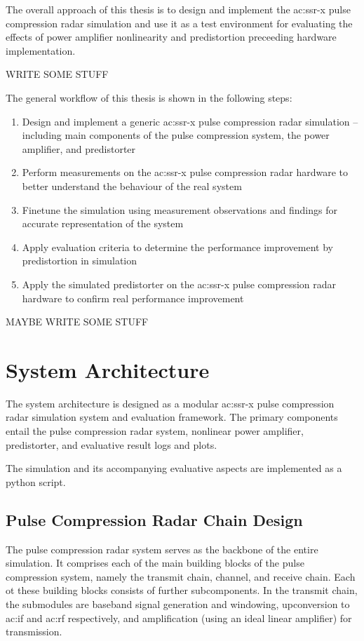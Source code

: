 The overall approach of this thesis is to design and implement the \gls{ac:ssr-x} pulse compression radar simulation and use it as a test environment for evaluating the effects of power amplifier nonlinearity and predistortion preceeding hardware implementation. 

WRITE SOME STUFF

The general workflow of this thesis is shown in the following steps:

\begin{enumerate}
  \item Design and implement a generic \gls{ac:ssr-x} pulse compression radar simulation -- including main components of the pulse compression system, the power amplifier, and predistorter
  \item Perform measurements on the \gls{ac:ssr-x} pulse compression radar hardware to better understand the behaviour of the real system
  \item Finetune the simulation using measurement observations and findings for accurate representation of the system
  \item Apply evaluation criteria to determine the performance improvement by predistortion in simulation
  \item Apply the simulated predistorter on the \gls{ac:ssr-x} pulse compression radar hardware to confirm real performance improvement
\end{enumerate}

MAYBE WRITE SOME STUFF

\section{System Architecture}

The system architecture is designed as a modular \gls{ac:ssr-x} pulse compression radar simulation system and evaluation framework. The primary components entail the pulse compression radar system, nonlinear power amplifier, predistorter, and evaluative result logs and plots. 

The simulation and its accompanying evaluative aspects are implemented as a python script.

\subsection{Pulse Compression Radar Chain Design}

The pulse compression radar system serves as the backbone of the entire simulation. It comprises each of the main building blocks of the pulse compression system, namely the transmit chain, channel, and receive chain. Each ot these building blocks consists of further subcomponents. In the transmit chain, the submodules are baseband signal generation and windowing, upconversion to \gls{ac:if} and \gls{ac:rf} respectively, and amplification (using an ideal linear amplifier) for transmission.

